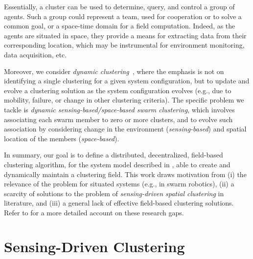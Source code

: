 Essentially, a cluster can be used to determine, query, and control a group of agents.
%
Such a group could represent a team, used for cooperation or to solve a common goal,
 or a space-time domain for a field computation.
%
Indeed, as the agents are situated in space,
 they provide a means for extracting data
 from their corresponding location,
 which may be instrumental for environment monitoring,
 data acquisition, etc.

Moreover, we consider \emph{dynamic clustering}~\cite{DBLP:journals/pr/RoaTG19},
 where the emphasis is not on identifying a single clustering
 for a given system configuration,
 but to update and evolve a clustering solution
 as the system configuration evolves
 (e.g., due to mobility, failure, or change in other clustering criteria).
%
The specific problem we tackle is \emph{dynamic sensing-based/space-based swarm clustering},
 which involves associating each swarm member
 to zero or more clusters, and to evolve such association by considering change in the environment (\emph{sensing-based}) and spatial location of the members (\emph{space-based}).
%

In summary, our goal is to define a distributed, decentralized, field-based
 clustering algorithm,
 for the system model described in ,
 able to create and dynamically maintain a clustering field.
%
%
%
This work draws motivation
 from
 (i) the relevance of the problem for situated systems (e.g., in swarm robotics),
 (ii) a scarcity of solutions to the problem of \emph{sensing-driven spatial clustering} in literature,
 and
 (iii) a general lack of effective field-based clustering solutions.
%
Refer to  for a more detailed account on these research gaps.


\section{Sensing-Driven Clustering}
\label{s:contrib}

